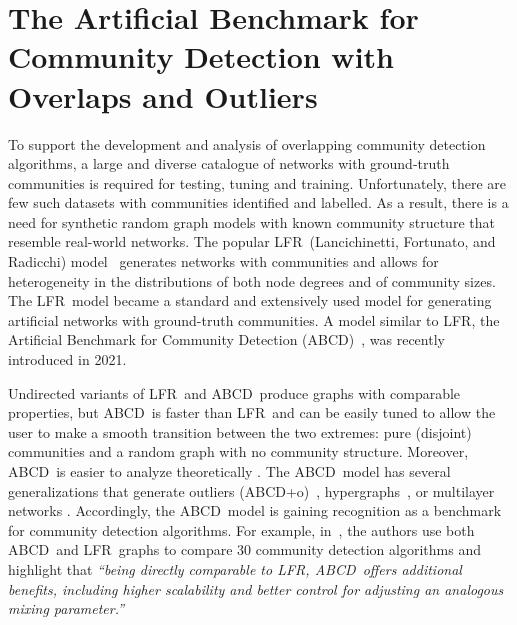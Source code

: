 \documentclass[review,los,12pt]{ryethesis}
\newcommand{\abcd}{{ABCD}}
\newcommand{\abcdo}{{ABCD+o}}
\newcommand{\lfr}{{LFR}}
\begin{document}
\chapter{The Artificial Benchmark for Community Detection with Overlaps and Outliers} \label{chap:abcdoo}
To support the development and analysis of overlapping community detection algorithms, a large and diverse catalogue of networks with ground-truth communities is required for testing, tuning and training.
Unfortunately, there are few such datasets with communities identified and labelled.
As a result, there is a need for synthetic random graph models with known community structure that resemble real-world networks.
The popular \lfr\ (Lancichinetti, Fortunato, and Radicchi) model~\cite{lfr,lfro} generates networks with communities and allows for heterogeneity in the distributions of both node degrees and of community sizes.
The \lfr\ model became a standard and extensively used model for generating artificial networks with ground-truth communities. 
A model similar to \lfr, the Artificial Benchmark for Community Detection (\abcd)~\cite{abcd}, was recently introduced in 2021.

Undirected variants of \lfr\ and \abcd\ produce graphs with comparable properties, but \abcd\ is faster than \lfr\ and can be easily tuned to allow the user to make a smooth transition between the two extremes: pure (disjoint) communities and a random graph with no community structure.
Moreover, \abcd\ is easier to analyze theoretically \cite{abcdmodularity,abcdselfsimilarity}.
The \abcd\ model has several generalizations that generate outliers (\abcdo)~\cite{abcdo}, hypergraphs~\cite{habcd}, or multilayer networks \cite{mabcd}.
Accordingly, the \abcd\ model is gaining recognition as a benchmark for community detection algorithms.
For example, in~\cite{bayan}, the authors use both \abcd\ and \lfr\ graphs to compare 30 community detection algorithms and highlight that \emph{``being directly comparable to \lfr, \abcd\ offers additional benefits, including higher scalability and better control for adjusting an analogous mixing parameter.''}
\end{document}

